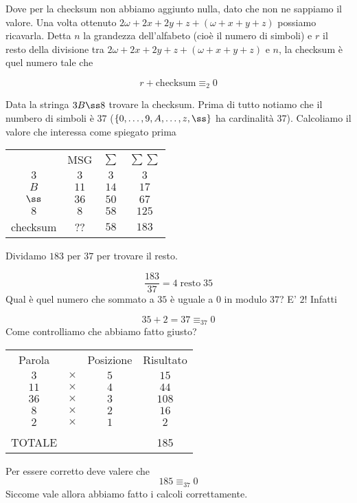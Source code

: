 \documentclass[12pt]{report}
\begin{document}
    \noindent
    Dove per la checksum non abbiamo aggiunto nulla, dato che non ne sappiamo il valore. Una volta ottenuto  $ 2\omega + 2x + 2y +z + (\omega + x + y + z)$ possiamo ricavarla. Detta $n$ la grandezza dell'alfabeto (cioè il numero di simboli) e $r$ il resto della divisione tra $ 2\omega + 2x + 2y +z + (\omega + x + y + z)$ e $n$, la checksum è quel numero tale che

    $$r + \text{checksum} \equiv_2 0$$

    \begin{exmp}
        Data la stringa $3B\ss 8$ trovare la checksum. Prima di tutto notiamo che il numbero di simboli è $37$ ($\{0,\dots,9,A,\dots,z,\ss\}$ ha cardinalità 37). Calcoliamo il valore che interessa come spiegato prima

        \begin{center}
            \begin{tabular}{cccc}
                & MSG &$\sum$ & $\sum \sum$\\
                $3$ & $3$ &$3$ & $3$ \\
                $B$ & $11$ &$14$& $17$ \\
                $\ss$ &  $36$ & $50$ & $67$ \\
                $8$ & $8$&$58$& $125$ \\
                checksum &  ??&$58$ & $183$
            \end{tabular}

        \end{center}

        \noindent
        Dividamo $183$ per $37$ per trovare il resto.

        $$\frac{183}{37} = 4 \; \text{resto} \; 35$$
        Qual è quel numero che sommato a $35$ è uguale a $0$ in modulo $37$? E' $2$! Infatti

        $$35 + 2 = 37 \equiv_{37} 0$$
        Come controlliamo che abbiamo fatto giusto?

        \vspace{10px}
        \begin{center}
            \begin{tabular}{cccc}
                Parola & & Posizione & Risultato \\
                $3$ & $\times$ & $5$ & $15$ \\
                $11$ & $\times$ & $4$ & $44$ \\
                $36$ & $\times$ & $3$ & $108$ \\
                $8$ & $\times$ & $2$ & $16$ \\
                $2$ & $\times$ & $1$ & $2$ \\
                & &  &  \\
                TOTALE & &  & 185  \\
            \end{tabular}
        \end{center}

        \noindent
        Per essere corretto deve valere che
        $$185 \equiv_{37} 0$$
        Siccome vale allora abbiamo fatto i calcoli correttamente.

    \end{exmp}
\end{document}
